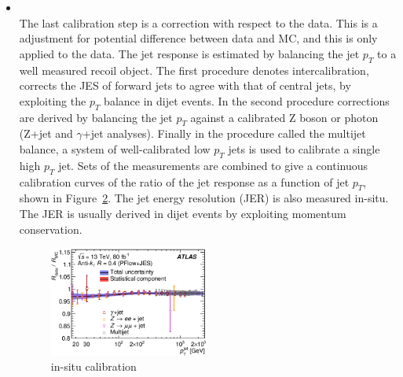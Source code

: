 \begin{itemize}
\begin{figure}[tbp]
\begin{center}
{      \cite{JETM-2018-05}
    }
    \label{fig:GSC}
    \end{center}
    \end{figure}
    \item \textbf{} \\
    The last calibration step is a correction with respect to the data. 
    This is a adjustment for potential difference between data and MC, and this is only applied to the data.
    The jet response is estimated by balancing the jet $p_T$ to a well measured recoil object. 
    The first procedure denotes intercalibration, corrects the JES of forward jets to agree with that of central jets, by exploiting the $p_T$ balance in dijet events. 
    In the second procedure corrections are derived by balancing the jet $p_T$ against a calibrated Z boson or photon (Z+jet and $\gamma$+jet analyses). 
    Finally in the procedure called the multijet balance, a system of well-calibrated low $p_T$ jets is used to calibrate a single high $p_T$ jet. %
    Sets of the measurements are combined to give a continuous calibration curves of the ratio of the jet response as a function of jet $p_T$, shown in Figure~\ref{fig:in-situcalibration}.
    The jet energy resolution (JER) is also measured in-situ. 
    The JER is usually derived in dijet events by exploiting momentum conservation.
    \begin{figure}[tbp]
    \begin{center}
    \includegraphics[width=0.5\textwidth,keepaspectratio]{figures/Reconstruction/insitucalibration}
    \caption{
    in-situ calibration \cite{JETM-2018-05}
    }
    \label{fig:in-situcalibration}
    \end{center}
    \end{figure}
\end{itemize}

